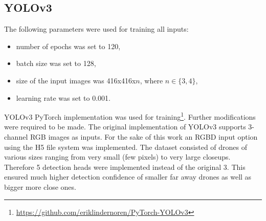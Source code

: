 \documentclass[twoside]{ctuthesis}
\theoremstyle{plain}
\theoremstyle{definition}
\theoremstyle{note}
\begin{document}
\subsection{YOLOv3}
The following parameters were used for training all inputs:
\begin{itemize}
	\item number of epochs was set to 120,
	\item batch size was set to 128,
	\item size of the input images was 416x416x$n$, where $n\in\{3,4\}$,
	\item learning rate was set to 0.001.
\end{itemize}
YOLOv3 PyTorch implementation was used for training\footnote{\url{https://github.com/eriklindernoren/PyTorch-YOLOv3}}. Further modifications were required to be made. The original implementation of YOLOv3 supports 3-channel RGB images as inputs. For the sake of this work an RGBD input option using the H5 file system was implemented. The dataset consisted of drones of various sizes ranging from very small (few pixels) to very large closeups. Therefore 5 detection heads were implemented instead of the original 3. This ensured much higher detection confidence of smaller far away drones as well as bigger more close ones.
\end{document}
